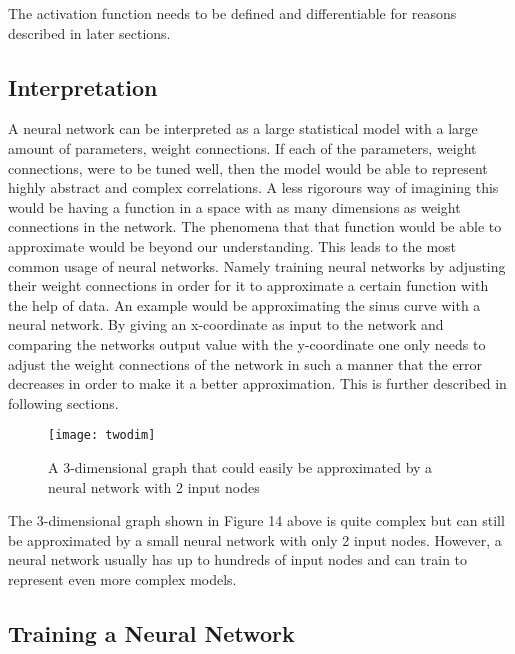\documentclass[titlepage]{article}
\begin{document}
\vskip 0.2cm

\noindent
The activation function needs to be defined and differentiable for reasons described in later sections.

\newpage

\subsection{Interpretation}

\vskip 0.2cm

A neural network can be interpreted as a large statistical model with a large amount of parameters, weight connections. If each of the parameters, weight connections, were to be tuned well, then the model would be able to represent highly abstract and complex correlations. A less rigorours way of imagining this would be having a function in a space with as many dimensions as weight connections in the network. The phenomena that that function would be able to approximate would be beyond our understanding. This leads to the most common usage of neural networks. Namely training neural networks by adjusting their weight connections in order for it to approximate a certain function with the help of data. An example would be approximating the sinus curve with a neural network. By giving an x-coordinate as input to the network and comparing the networks output value with the y-coordinate one only needs to adjust the weight connections of the network in such a manner that the error decreases in order to make it a better approximation. This is further described in following sections.

\vskip 0.5cm

\begin{figure}[h]
    \center
    \texttt{[image: twodim]}
    \vskip 0.3cm
    \caption{A 3-dimensional graph that could easily be approximated by a neural network with 2 input nodes}
\end{figure}

\vskip 0.2cm

\noindent
The 3-dimensional graph shown in Figure 14 above is quite complex but can still be approximated by a small neural network with only 2 input nodes. However, a neural network usually has up to hundreds of input nodes and can train to represent even more complex models.

\newpage

\subsection{Training a Neural Network}
\end{document}
